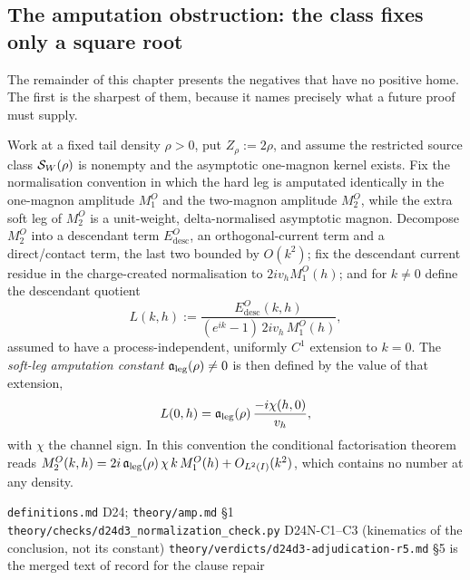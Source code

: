 \subsection{The amputation obstruction: the class fixes only a square root}
\label{sub:amputation-obstruction}

The remainder of this chapter presents the negatives that have no positive
home. The first is the sharpest of them, because it names precisely what a
future proof must supply.

\begin{definition}
\label{def:amputation-constant}
Work at a fixed tail density $\rho > 0$, put $Z_\rho := 2\rho$, and assume the
restricted source class $\mathcal{S}_W(\rho)$ is nonempty and the asymptotic
one-magnon kernel exists. Fix the normalisation convention in which the hard
leg is amputated identically in the one-magnon amplitude $M_1^O$ and the
two-magnon amplitude $M_2^O$, while the extra soft leg of $M_2^O$ is a
unit-weight, delta-normalised asymptotic magnon. Decompose $M_2^O$ into a
descendant term $E^O_{\mathrm{desc}}$, an orthogonal-current term and a
direct/contact term, the last two bounded by $O(k^2)$; fix the descendant
current residue in the charge-created normalisation to $2iv_h M_1^O(h)$; and
for $k \neq 0$ define the descendant quotient
\begin{equation}
  L(k,h) := \frac{E^O_{\mathrm{desc}}(k,h)}{(e^{ik}-1)\,2iv_h\,M_1^O(h)},
\end{equation}
assumed to have a process-independent, uniformly $C^1$ extension to $k=0$.
The \emph{soft-leg amputation constant} $\mathfrak{a}_{\mathrm{leg}}(\rho) \neq 0$ is then defined by
the value of that extension,
\begin{equation}
  L(0,h) = \mathfrak{a}_{\mathrm{leg}}(\rho)\,\frac{-i\chi(h,0)}{v_h},
  \label{eq:aleg-defn}
\end{equation}
with $\chi$ the channel sign. In this convention the conditional
factorisation theorem reads $M_2^O(k,h) = 2i\,\mathfrak{a}_{\mathrm{leg}}(\rho)\,\chi\,k\,M_1^O(h)
+ O_{L^2(I)}(k^2)$, which contains no number at any density.
\end{definition}

%
{\texttt{definitions.md} D24; \texttt{theory/amp.md} §1}%
{\texttt{theory/checks/d24d3\_normalization\_check.py} D24N-C1--C3 (kinematics of the conclusion, not its constant)}%
{\texttt{theory/verdicts/d24d3-adjudication-r5.md} §5 is the merged text of record for the clause repair}

